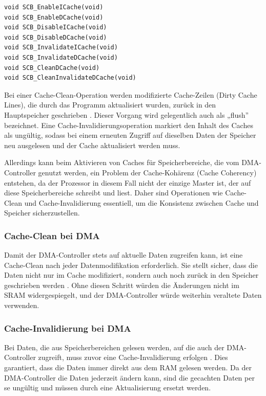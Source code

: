 \begin{code}
\begin{verbatim}
void SCB_EnableICache(void)
void SCB_EnableDCache(void)
void SCB_DisableICache(void)
void SCB_DisableDCache(void)
void SCB_InvalidateICache(void)
void SCB_InvalidateDCache(void)
void SCB_CleanDCache(void)
void SCB_CleanInvalidateDCache(void)
\end{verbatim}
\end{code}

Bei einer Cache-Clean-Operation werden modifizierte Cache-Zeilen (Dirty Cache
Lines), die durch das Programm aktualisiert wurden, zurück in den Hauptspeicher
geschrieben \cite[S. 4]{an4839}. Dieser Vorgang wird gelegentlich auch als
„flush” bezeichnet. Eine Cache-Invalidierungsoperation markiert den Inhalt des
Caches als ungültig, sodass bei einem erneuten Zugriff auf dieselben Daten der
Speicher neu ausgelesen und der Cache aktualisiert werden muss.

Allerdings kann beim Aktivieren von Caches für Speicherbereiche, die vom
DMA-Controller genutzt werden, ein Problem der Cache-Kohärenz (Cache Coherency)
entstehen, da der Prozessor in diesem Fall nicht der einzige Master ist, der auf
diese Speicherbereiche schreibt und liest. Daher sind Operationen wie
Cache-Clean und Cache-Invalidierung essentiell, um die Konsistenz zwischen Cache
und Speicher sicherzustellen.

\subsubsection{Cache-Clean bei DMA}

Damit der DMA-Controller stets auf aktuelle Daten zugreifen kann, ist eine
Cache-Clean nach jeder Datenmodifikation erforderlich. Sie stellt sicher, dass
die Daten nicht nur im Cache modifiziert, sondern auch noch zurück in den
Speicher geschrieben werden \cite[S. 6]{an4839}. Ohne diesen Schritt würden die
Änderungen nicht im SRAM widergespiegelt, und der DMA-Controller würde weiterhin
veraltete Daten verwenden.

\subsubsection{Cache-Invalidierung bei DMA}

Bei Daten, die aus Speicherbereichen gelesen werden, auf die auch der
DMA-Controller zugreift, muss zuvor eine Cache-Invalidierung erfolgen
\cite{embeddedexpert_cache}. Dies garantiert, dass die Daten immer direkt aus
dem RAM gelesen werden. Da der DMA-Controller die Daten jederzeit ändern kann,
sind die gecachten Daten per se ungültig und müssen durch eine Aktualisierung
ersetzt werden.

